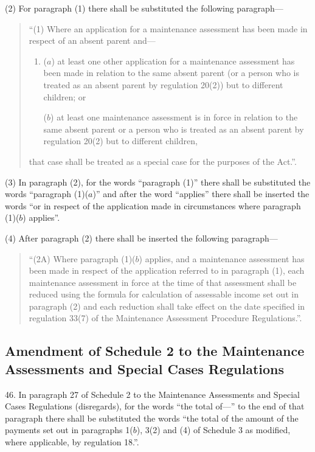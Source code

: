 \documentclass[12pt,a4paper]{article}
\begin{document}
(2) For paragraph (1) there shall be substituted the following paragraph—
\begin{quotation}
“(1) Where an application for a maintenance assessment has been made in respect of an absent parent and—
\begin{enumerate}\item[]
($a$) at least one other application for a maintenance assessment has been made in relation to the same absent parent (or a person who is treated as an absent parent by regulation 20(2)) but to different children; or

($b$) at least one maintenance assessment is in force in relation to the same absent parent or a person who is treated as an absent parent by regulation 20(2) but to different children,
\end{enumerate}
that case shall be treated as a special case for the purposes of the Act.”.
\end{quotation}

(3) In paragraph (2), for the words “paragraph (1)” there shall be substituted the words “paragraph (1)($a$)” and after the word “applies” there shall be inserted the words “or in respect of the application made in circumstances where paragraph (1)($b$) applies”.

(4) After paragraph (2) there shall be inserted the following paragraph—
\begin{quotation}
“(2A) Where paragraph (1)($b$) applies, and a maintenance assessment has been made in respect of the application referred to in paragraph (1), each maintenance assessment in force at the time of that assessment shall be reduced using the formula for calculation of assessable income set out in paragraph (2) and each reduction shall take effect on the date specified in regulation 33(7) of the Maintenance Assessment Procedure Regulations.”.
\end{quotation}

\subsection[46. Amendment of Schedule 2 to the Maintenance Assessments and Special Cases Regulations]{Amendment of Schedule 2 to the Maintenance Assessments and Special Cases Regulations}

46.  In paragraph 27 of Schedule 2 to the Maintenance Assessments and Special Cases Regulations (disregards), for the words “the total of—” to the end of that paragraph there shall be substituted the words “the total of the amount of the payments set out in paragraphs 1($b$), 3(2) and (4) of Schedule 3 as modified, where applicable, by regulation 18.”.
\end{document}
